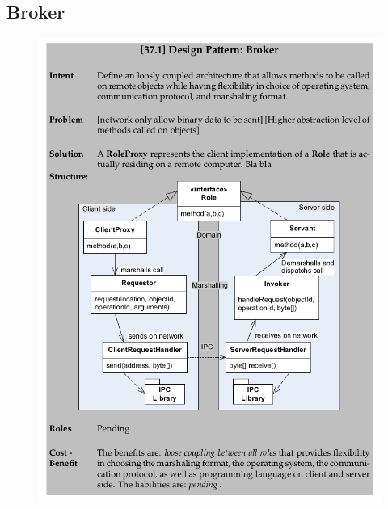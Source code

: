 \documentclass[a4, english]{article}
\begin{document}
\subsection{Broker}
\begin{figure}[h!]
	\centering
	\includegraphics[width=\linewidth]{img/broker_pattern}
\end{figure}
\end{document}
